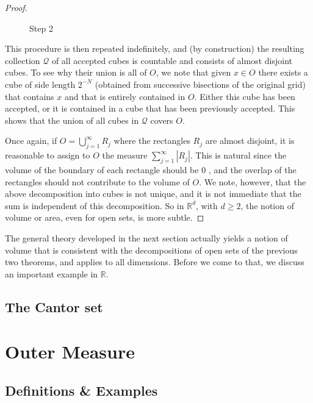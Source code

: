 \documentclass[UTF8,12pt,AutoFakeBold]{ctexbook}
\numberwithin{equation}{section}
\begin{document}
\begin{proof}
\begin{multicols}{2}
\begin{figure}[H]
			\caption{Step 2}
		\end{figure}
		\end{multicols}
		
		This procedure is then repeated indefinitely, and (by construction) the resulting collection $\mathcal{Q}$ of all accepted cubes is countable and consists of almost disjoint cubes. To see why their union is all of $O$, we note that given $x \in O$ there exists a cube of side length $2^{-N}$ (obtained from successive bisections of the original grid) that contains $x$ and that is entirely contained in $O$. Either this cube has been accepted, or it is contained in a cube that has been previously accepted. This shows that the union of all cubes in $\mathcal{Q}$ covers $O$.
		
		Once again, if $O=\bigcup_{j=1}^{\infty} R_j$ where the rectangles $R_j$ are almost disjoint, it is reasonable to assign to $O$ the measure $\sum_{j=1}^{\infty}\left|R_j\right|$. This is natural since the volume of the boundary of each rectangle should be 0 , and the overlap of the rectangles should not contribute to the volume of $O$. We note, however, that the above decomposition into cubes is not unique, and it is not immediate that the sum is independent of this decomposition. So in $\mathbb{R}^d$, with $d \geq 2$, the notion of volume or area, even for open sets, is more subtle.
		
	\end{proof}
	
	The general theory developed in the next section actually yields a notion of volume that is consistent with the decompositions of open sets of the previous two theorems, and applies to all dimensions. Before we come to that, we discuss an important example in $\mathbb{R}$.
	
	\subsection{The Cantor set}
	

	\section{Outer Measure}
	
	\subsection{Definitions \& Examples}
	
\end{document}
